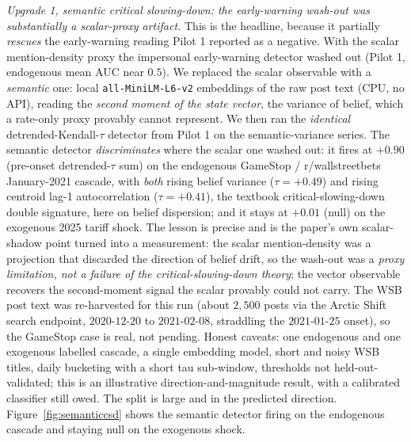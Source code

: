 \documentclass[11pt]{article}
\begin{document}
\emph{Upgrade 1, semantic critical slowing-down: the early-warning wash-out was substantially a scalar-proxy artifact.} This is the headline, because it partially \emph{rescues} the early-warning reading Pilot 1 reported as a negative. With the scalar mention-density proxy the impersonal early-warning detector washed out (Pilot 1, endogenous mean AUC near $0.5$). We replaced the scalar observable with a \emph{semantic} one: local \texttt{all-MiniLM-L6-v2} embeddings of the raw post text (CPU, no API), reading the \emph{second moment of the state vector}, the variance of belief, which a rate-only proxy provably cannot represent. We then ran the \emph{identical} detrended-Kendall-$\tau$ detector from Pilot 1 on the semantic-variance series. The semantic detector \emph{discriminates} where the scalar one washed out: it fires at $+0.90$ (pre-onset detrended-$\tau$ sum) on the endogenous GameStop / r/wallstreetbets January-2021 cascade, with \emph{both} rising belief variance ($\tau=+0.49$) and rising centroid lag-1 autocorrelation ($\tau=+0.41$), the textbook critical-slowing-down double signature, here on belief dispersion; and it stays at $+0.01$ (null) on the exogenous 2025 tariff shock. The lesson is precise and is the paper's own scalar-shadow point turned into a measurement: the scalar mention-density was a projection that discarded the direction of belief drift, so the wash-out was a \emph{proxy limitation, not a failure of the critical-slowing-down theory}; the vector observable recovers the second-moment signal the scalar provably could not carry. The WSB post text was re-harvested for this run (about $2{,}500$ posts via the Arctic Shift search endpoint, $2020$-$12$-$20$ to $2021$-$02$-$08$, straddling the $2021$-$01$-$25$ onset), so the GameStop case is real, not pending. Honest caveats: one endogenous and one exogenous labelled cascade, a single embedding model, short and noisy WSB titles, daily bucketing with a short tau sub-window, thresholds not held-out-validated; this is an illustrative direction-and-magnitude result, with a calibrated classifier still owed. The split is large and in the predicted direction. Figure~\ref{fig:semanticcsd} shows the semantic detector firing on the endogenous cascade and staying null on the exogenous shock.
\end{document}
